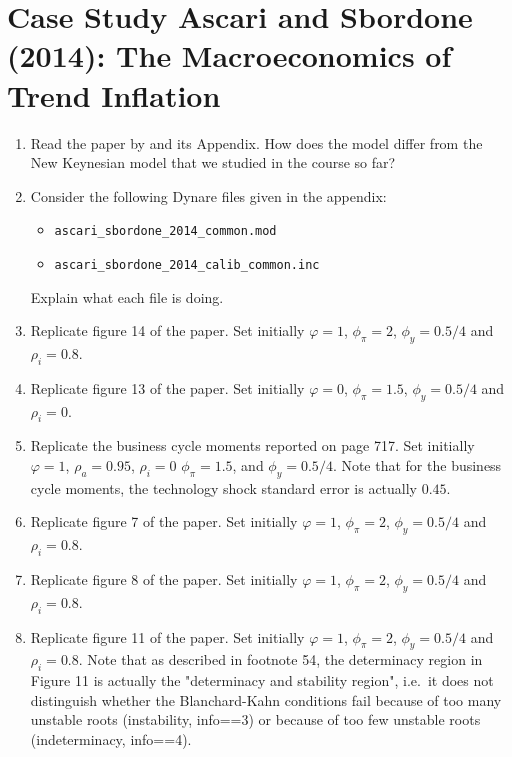 \section[Case Study Ascari and Sbordone (2014): The Macroeconomics of Trend Inflation]{Case Study Ascari and Sbordone (2014): The Macroeconomics of Trend Inflation\label{ex:CaseStudy.Ascari.Sbordone.2014}}

\begin{enumerate}
\item Read the paper by \textcite{Ascari.Sbordone_2014_MacroeconomicsTrendInflation} and its Appendix.
How does the model differ from the New Keynesian model that we studied in the course so far?

\item Consider the following Dynare files given in the appendix:
\begin{itemize}
  \item \texttt{ascari\_sbordone\_2014\_common.mod}
  \item \texttt{ascari\_sbordone\_2014\_calib\_common.inc}
\end{itemize}
Explain what each file is doing.

\item Replicate figure 14 of the paper.
Set initially $\varphi = 1$, $\phi_\pi=2$, $\phi_y = 0.5/4$ and $\rho_i=0.8$.

\item Replicate figure 13 of the paper.
Set initially $\varphi = 0$, $\phi_\pi=1.5$, $\phi_y = 0.5/4$ and $\rho_i=0$.

\item Replicate the business cycle moments reported on page 717.
Set initially $\varphi = 1$, $\rho_a=0.95$, $\rho_i=0$ $\phi_\pi=1.5$, and $\phi_y = 0.5/4$.
Note that for the business cycle moments, the technology shock standard error is actually $0.45$.

\item Replicate figure 7 of the paper.
Set initially $\varphi = 1$, $\phi_\pi=2$, $\phi_y = 0.5/4$ and $\rho_i=0.8$.

\item Replicate figure 8 of the paper.
Set initially $\varphi = 1$, $\phi_\pi=2$, $\phi_y = 0.5/4$ and $\rho_i=0.8$.

\item Replicate figure 11 of the paper.
Set initially $\varphi = 1$, $\phi_\pi=2$, $\phi_y = 0.5/4$ and $\rho_i=0.8$.
Note that as described in footnote 54, the determinacy region in Figure 11 is actually the "determinacy and stability region",
  i.e.\ it does not distinguish whether the Blanchard-Kahn conditions fail because of too many unstable roots (instability, info==3)
  or because of too few unstable roots (indeterminacy, info==4).

\end{enumerate}

